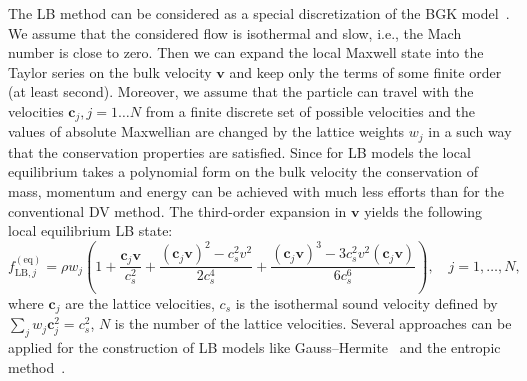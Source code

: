 \documentclass[]{elsarticle} %
\newcommand{\bv}{\boldsymbol{v}}
\newcommand{\bc}{\boldsymbol{c}}
\newcommand{\equil}[1]{#1^\mathrm{(eq)}}
\newcommand{\LB}{\mathrm{LB}}
\begin{document}
The LB method can be considered as a special discretization of the BGK model~\cite{Succi2001}.
We assume that the considered flow is isothermal and slow, i.e., the Mach number is close to zero. Then we can expand the local Maxwell state into the Taylor series on the bulk velocity $\bv$ and keep only the
terms of some finite order (at least second).
Moreover, we assume that the particle can travel with the velocities $\bc_{j}, j=1 \ldots N$ from a finite discrete set of possible velocities
and the values of absolute Maxwellian are changed by the lattice weights $w_j$ in a such way that  the conservation properties are satisfied. Since for LB models the local equilibrium takes a polynomial form on the bulk velocity the conservation of mass, momentum and energy can be achieved with much less efforts than for the conventional DV method.
The third-order expansion in $\bv$ yields the following local equilibrium LB state:
\begin{equation}\label{eq:lbgk}
    \equil{f}_{\LB,j} = \rho w_j\left(1+ \frac{\bc_j\bv}{c_s^2}+\frac{(\bc_j\bv)^2-c_s^2v^2}{2c_s^4}
    + \frac{(\bc_j\bv)^3-3c_s^2 v^2(\bc_j\bv)}{6c_s^6}\right), \quad j=1,\ldots,N,
\end{equation}
where $\bc_j$ are the lattice velocities, $c_s$ is the isothermal sound velocity defined by $\sum_jw_j\bc^2_j=c_s^2$,
$N$ is the number of the lattice velocities.
Several approaches can be applied for the construction of LB models like Gauss--Hermite~\cite{He1997, Shan1998, Shan2006, Shan2010}
and the entropic method~\cite{Karlin1999, Chikatamarla2006, Chikatamarla2009}.




\end{document}
